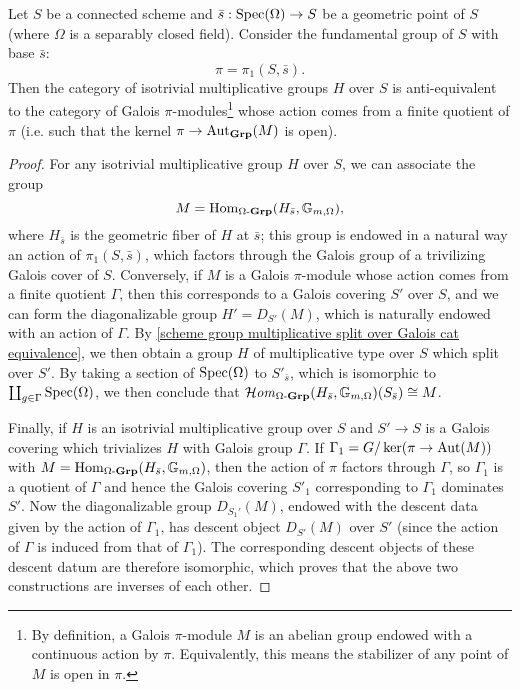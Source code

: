 \begin{corollary}\label{scheme group multiplicative cat equivalence}
Let $S$ be a connected scheme and $\bar{s}:\mathrm{Spec}(\Omega)\to S$ be a geometric point of $S$ (where $\Omega$ is a separably closed field). Consider the fundamental group of $S$ with base $\bar{s}$:
\[\pi=\pi_1(S,\bar{s}).\]
Then the category of isotrivial multiplicative groups $H$ over $S$ is anti-equivalent to the category of Galois $\pi$-modules\footnote{By definition, a Galois $\pi$-module $M$ is an abelian group endowed with a continuous action by $\pi$. Equivalently, this means the stabilizer of any point of $M$ is open in $\pi$.} whose action comes from a finite quotient of $\pi$ (i.e. such that the kernel $\pi\to\mathrm{Aut}_{\mathbf{Grp}}(M)$ is open).
\end{corollary}
\begin{proof}
For any isotrivial multiplicative group $H$ over $S$, we can associate the group
\[M=\mathrm{Hom}_{\Omega\textup{-}\mathbf{Grp}}(H_{\bar{s}},\mathbb{G}_{m,\Omega}),\]
where $H_{\bar{s}}$ is the geometric fiber of $H$ at $\bar{s}$; this group is endowed in a natural way an action of $\pi_1(S,\bar{s})$, which factors through the Galois group of a trivilizing Galois cover of $S$. Conversely, if $M$ is a Galois $\pi$-module whose action comes from a finite quotient $\Gamma$, then this corresponds to a Galois covering $S'$ over $S$, and we can form the diagonalizable group $H'=D_{S'}(M)$, which is naturally endowed with an action of $\Gamma$. By \cref{scheme group multiplicative split over Galois cat equivalence}, we then obtain a group $H$ of multiplicative type over $S$ which split over $S'$. By taking a section of $\mathrm{Spec}(\Omega)$ to $S'_{\bar{s}}$, which is isomorphic to $\coprod_{g\in\Gamma}\mathrm{Spec}(\Omega)$, we then conclude that $\operatorname{\mathcal{H}\hspace*{-0.4pt}\textit{om}\hspace{0.5pt}}_{\Omega\textup{-}\mathbf{Grp}}(H_{\bar{s}},\mathbb{G}_{m,\Omega})(S_{\bar{s}})\cong M$.\par
Finally, if $H$ is an isotrivial multiplicative group over $S$ and $S'\to S$ is a Galois covering which trivializes $H$ with Galois group $\Gamma$. If $\Gamma_1=G/\operatorname{ker}(\pi\to\mathrm{Aut}(M))$ with $M=\mathrm{Hom}_{\Omega\textup{-}\mathbf{Grp}}(H_{\bar{s}},\mathbb{G}_{m,\Omega})$, then the action of $\pi$ factors through $\Gamma$, so $\Gamma_1$ is a quotient of $\Gamma$ and hence the Galois covering $S'_1$ corresponding to $\Gamma_1$ dominates $S'$. Now the diagonalizable group $D_{S_1'}(M)$, endowed with the descent data given by the action of $\Gamma_1$, has descent object $D_{S'}(M)$ over $S'$ (since the action of $\Gamma$ is induced from that of $\Gamma_1$). The corresponding descent objects of these descent datum are therefore isomorphic, which proves that the above two constructions are inverses of each other.
\end{proof}

